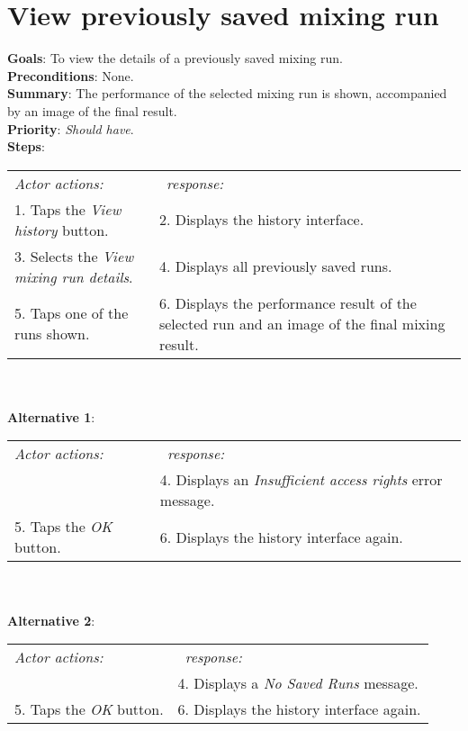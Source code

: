 \section{View previously saved mixing run}
  \label{mixhist}
  \textbf{Goals}: To view the details of a previously saved mixing run.\\
  \textbf{Preconditions}: None.\\
  \textbf{Summary}: The performance of the selected mixing run is shown, accompanied by an image of the final result.\\
  \textbf{Priority}: \emph{Should have}.\\
  \textbf{Steps}: \\
    \begin{tabular}{ p{} p{} }
  	\emph{Actor actions:} & \emph{\projectname\ response:} \\
    1. Taps the \emph{View history} button. & 2. Displays the history interface.\\
    3. Selects the \emph{View mixing run details}. & 4. Displays all previously saved runs.\\
    5. Taps one of the runs shown. & 6. Displays the performance result of the selected run and an image of the final mixing result. \\
    \end{tabular}
    \\
     \\\textbf{Alternative 1}: \\
    \begin{tabular}{ p{} p{} }
  	\emph{Actor actions:} & \emph{\projectname\ response:} \\
            & 4. Displays an \emph{Insufficient access rights} error message. \\
    5. Taps the \emph{OK} button. & 6. Displays the history interface again. \\
    \end{tabular}
        \\
     \\\textbf{Alternative 2}: \\
    \begin{tabular}{ p{} p{} }
  	\emph{Actor actions:} & \emph{\projectname\ response:} \\
            & 4. Displays a \emph{No Saved Runs} message. \\
    5. Taps the \emph{OK} button. & 6. Displays the history interface again. \\
    \end{tabular}
    
